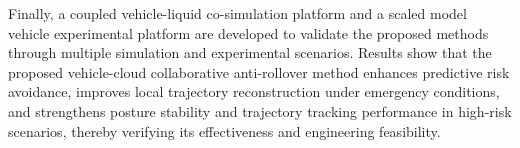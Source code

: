\begin{abstract*}
Finally, a coupled vehicle-liquid co-simulation platform and a scaled model vehicle experimental platform are developed to validate the proposed methods through multiple simulation and experimental scenarios. Results show that the proposed vehicle-cloud collaborative anti-rollover method enhances predictive risk avoidance, improves local trajectory reconstruction under emergency conditions, and strengthens posture stability and trajectory tracking performance in high-risk scenarios, thereby verifying its effectiveness and engineering feasibility.

\end{abstract*}
